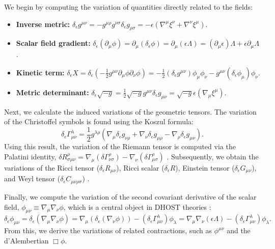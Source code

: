 \documentclass[twocolumn]{aastex631}
\begin{document}
We begin by computing the variation of quantities directly related to the fields:
\begin{itemize}
    \item \textbf{Inverse metric:} $\delta_\epsilon g^{\mu\nu} = -g^{\mu\rho}g^{\nu\sigma}\delta_\epsilon g_{\rho\sigma} = -\epsilon(\nabla^\mu\xi^\nu + \nabla^\nu\xi^\mu)$.
    \item \textbf{Scalar field gradient:} $\delta_\epsilon(\partial_\mu \phi) = \partial_\mu(\delta_\epsilon \phi) = \partial_\mu(\epsilon\Lambda) = (\partial_\mu\epsilon)\Lambda + \epsilon\partial_\mu\Lambda$.
    \item \textbf{Kinetic term:} $\delta_\epsilon X = \delta_\epsilon(-\frac{1}{2}g^{\mu\nu}\partial_\mu\phi\partial_\nu\phi) = -\frac{1}{2}(\delta_\epsilon g^{\mu\nu})\phi_\mu\phi_\nu - g^{\mu\nu}(\delta_\epsilon\phi_\mu)\phi_\nu$.
    \item \textbf{Metric determinant:} $\delta_\epsilon \sqrt{-g} = \frac{1}{2}\sqrt{-g}g^{\mu\nu}\delta_\epsilon g_{\mu\nu} = \sqrt{-g} \epsilon (\nabla_\mu \xi^\mu)$.
\end{itemize}
Next, we calculate the induced variations of the geometric tensors. The variation of the Christoffel symbols is found using the Koszul formula:
\begin{equation}
\delta_\epsilon \Gamma^\lambda_{\mu\nu} = \frac{1}{2} g^{\lambda\rho} (\nabla_\mu \delta_\epsilon g_{\nu\rho} + \nabla_\nu \delta_\epsilon g_{\mu\rho} - \nabla_\rho \delta_\epsilon g_{\mu\nu}).
\end{equation}
Using this result, the variation of the Riemann tensor is computed via the Palatini identity, $\delta R^\rho_{\sigma\mu\nu} = \nabla_\mu(\delta \Gamma^\rho_{\nu\sigma}) - \nabla_\nu(\delta \Gamma^\rho_{\mu\sigma})$ \citep{yuan2013modifiedvariationalprinciplegravity,bombacigno2025gravitationalwavespalatinigravity}. Subsequently, we obtain the variations of the Ricci tensor ($\delta_\epsilon R_{\mu\nu}$), Ricci scalar ($\delta_\epsilon R$), Einstein tensor ($\delta_\epsilon G_{\mu\nu}$), and Weyl tensor ($\delta_\epsilon C_{\mu\nu\rho\sigma}$) \citep{bombacigno2025gravitationalwavespalatinigravity}.

Finally, we compute the variation of the second covariant derivative of the scalar field, $\phi_{\mu\nu} \equiv \nabla_\mu\nabla_\nu \phi$, which is a central object in DHOST theories \citep{minamitsuji2021generalizeddisformalinvariancecosmological,minamitsuji2021generalizeddisformalinvariancecosmological,rosa2024junctionconditionsgravitytheories}:
\begin{equation}
\delta_\epsilon \phi_{\mu\nu} = \delta_\epsilon (\nabla_\mu\nabla_\nu \phi) = \nabla_\mu(\delta_\epsilon(\nabla_\nu\phi)) - (\delta_\epsilon \Gamma^\lambda_{\mu\nu})\phi_\lambda = \nabla_\mu\nabla_\nu(\epsilon\Lambda) - (\delta_\epsilon \Gamma^\lambda_{\mu\nu})\phi_\lambda.
\end{equation}
From this, we derive the variations of related contractions, such as $\phi^{\mu\nu}$ and the d'Alembertian $\Box\phi$.
\end{document}

